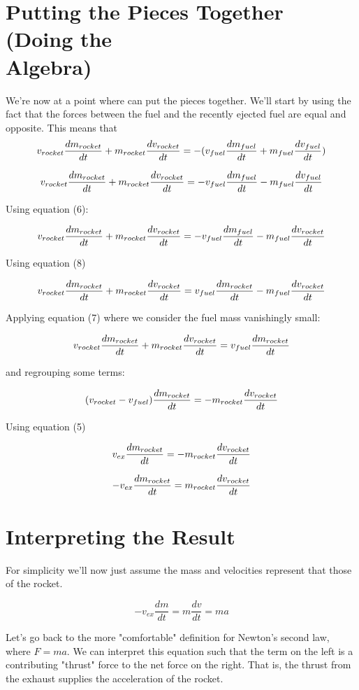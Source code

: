 \documentclass{article}
\begin{document}
\section{Putting the Pieces Together (Doing the \\ Algebra)}
We're now at a point where can put the pieces together. We'll start by using the fact that the forces between the fuel and the recently ejected fuel are equal and opposite. This means that 
$$v_{rocket} \frac{dm_{rocket}}{dt} + m_{rocket}  \frac{dv_{rocket}}{dt} = - ( v_{fuel} \frac{dm_{fuel}}{dt} + m_{fuel}  \frac{dv_{fuel}}{dt})$$

$$v_{rocket} \frac{dm_{rocket}}{dt} + m_{rocket}  \frac{dv_{rocket}}{dt} = - v_{fuel} \frac{dm_{fuel}}{dt} - m_{fuel}  \frac{dv_{fuel}}{dt}$$

Using equation (6):

$$v_{rocket} \frac{dm_{rocket}}{dt} + m_{rocket}  \frac{dv_{rocket}}{dt} = - v_{fuel} \frac{dm_{fuel}}{dt} - m_{fuel}  \frac{dv_{rocket}}{dt}$$

Using equation (8)

$$v_{rocket} \frac{dm_{rocket}}{dt} + m_{rocket}  \frac{dv_{rocket}}{dt} = v_{fuel} \frac{dm_{rocket}}{dt} - m_{fuel}  \frac{dv_{rocket}}{dt}$$

Applying equation (7) where we consider the fuel mass vanishingly small:

$$v_{rocket} \frac{dm_{rocket}}{dt} + m_{rocket}  \frac{dv_{rocket}}{dt} = v_{fuel} \frac{dm_{rocket}}{dt}$$


and regrouping some terms:

$$(v_{rocket} - v_{fuel})\frac{dm_{rocket}}{dt} = - m_{rocket}\frac{dv_{rocket}}{dt} $$

Using equation (5)

$$v_{ex}\frac{dm_{rocket}}{dt} = - m_{rocket}\frac{dv_{rocket}}{dt}$$

\begin{equation}
-v_{ex}\frac{dm_{rocket}}{dt} = m_{rocket}\frac{dv_{rocket}}{dt}
\end{equation}

\section {Interpreting the Result}
For simplicity we'll now just assume the mass and velocities represent that those of the rocket.

\begin{equation}
-v_{ex}\frac{dm}{dt} = m\frac{dv}{dt} = ma
\end{equation}\par
Let's go back to the more "comfortable" definition for Newton's second law, where $F=ma$.
We can interpret this equation such that the term on the left is a contributing "thrust" force to the net force on the right. That is, the thrust from the exhaust supplies the acceleration of the rocket.
\end{document}
